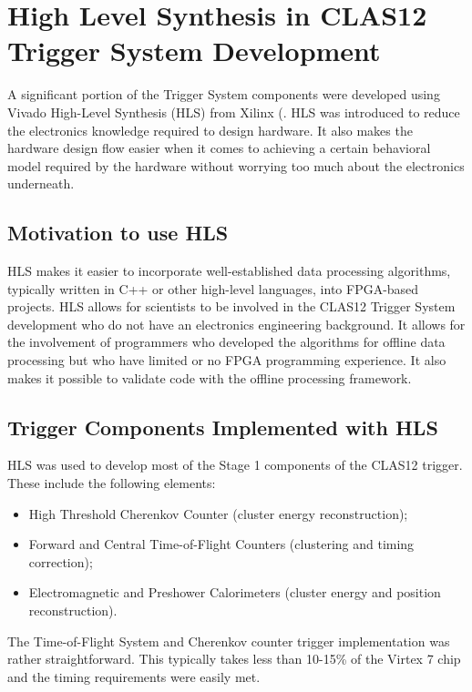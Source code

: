\section{High Level Synthesis in CLAS12 Trigger System Development}
\label{sec:hls}

A significant portion of the Trigger System components were developed using Vivado High-Level Synthesis (HLS) from Xilinx (\cite{hls-ref}. HLS was introduced to reduce the electronics knowledge required to design hardware. It also makes the hardware design flow easier when it comes to achieving a certain behavioral model required by the hardware without worrying too much about the electronics underneath.

\subsection{Motivation to use HLS}

HLS makes it easier to incorporate well-established data processing algorithms, typically written in C++ or other high-level languages, into FPGA-based projects. HLS allows for scientists to be involved in the CLAS12 Trigger System development who do not have an electronics engineering background. It allows for the involvement of programmers who developed the algorithms for offline data processing but who have limited or no FPGA programming experience. It also makes it possible to validate code with the offline processing framework.

\subsection{Trigger Components Implemented with HLS}

HLS was used to develop most of the Stage 1 components of the CLAS12 trigger. These include the following elements:

\begin{itemize}
	\item High Threshold Cherenkov Counter (cluster energy reconstruction);
	\item Forward and Central Time-of-Flight Counters (clustering and timing correction);
	\item Electromagnetic and Preshower Calorimeters (cluster energy and position reconstruction).
\end{itemize}

The Time-of-Flight System and Cherenkov counter trigger implementation was rather straightforward. This typically takes less than 10-15\% of the Virtex 7 chip and the timing requirements were easily met.

